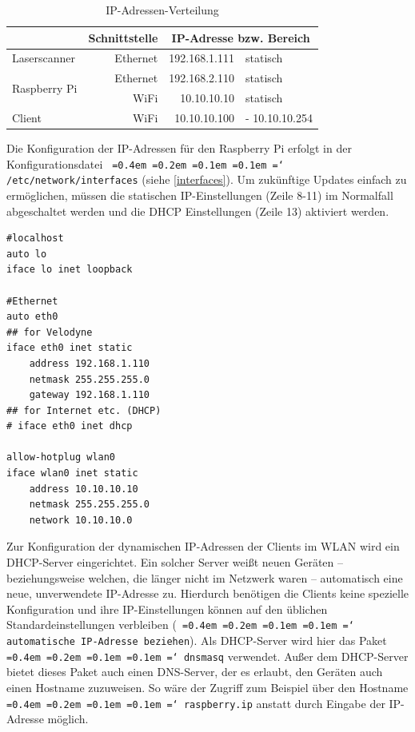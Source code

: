 \documentclass[a4paper,12pt,bibliography=totoc, listof=totoc,titlepage,pointlessnumbers]{scrreprt}
\newcommand*\justify{%
  \fontdimen2\font=0.4em%
  \fontdimen3\font=0.2em%
  \fontdimen4\font=0.1em%
  \fontdimen7\font=0.1em%
  \hyphenchar\font=`\-%
}
\newcommand{\code}[1]{\texttt{\justify{#1}}}
\begin{document}
\begin{table}[!ht]
\centering
\begin{tabular}{l|r|r|l|}
\cline{2-4}
                                                    & Schnittstelle & \multicolumn{2}{c|}{IP-Adresse bzw. Bereich} \\ \hline
\multicolumn{1}{|l|}{Laser\-scan\-ner}                  & Ethernet      & 192.168.1.111        & statisch              \\ \hline
\multicolumn{1}{|l|}{\multirow{2}{*}{Rasp\-berry Pi}} & Ethernet      & 192.168.2.110        & statisch              \\ \cline{2-4} 
\multicolumn{1}{|l|}{}                              & WiFi          & 10.10.10.10          & statisch              \\ \hline
\multicolumn{1}{|l|}{Client}                        & WiFi          & 10.10.10.100         & - 10.10.10.254        \\ \hline
\end{tabular}
\caption{IP-Adressen-Verteilung}
\label{tab:ipAdressen}
\end{table}

Die Konfiguration der IP-Adressen für den Rasp\-berry Pi erfolgt in der Konfigurationsdatei \code{/etc/network/interfaces} (siehe \autoref{interfaces}). Um zukünftige Updates einfach zu ermöglichen, müssen die statischen IP-Einstellungen (Zeile 8-11) im Normalfall abgeschaltet werden und die DHCP Einstellungen (Zeile 13) aktiviert werden. \citep{accesspoint}

\begin{lstlisting}[caption={Konfiguration der \code{/etc/network/interfaces}}, label={interfaces}]
#localhost
auto lo
iface lo inet loopback

#Ethernet
auto eth0
## for Velodyne
iface eth0 inet static
	address 192.168.1.110
	netmask 255.255.255.0
	gateway 192.168.1.110
## for Internet etc. (DHCP)
# iface eth0 inet dhcp

allow-hotplug wlan0
iface wlan0 inet static
	address 10.10.10.10
	netmask 255.255.255.0
	network 10.10.10.0
\end{lstlisting}

Zur Konfiguration der dynamischen IP-Adressen der Clients im WLAN wird ein DHCP-Server eingerichtet. Ein solcher Server weißt neuen Geräten -- beziehungsweise welchen, die länger nicht im Netzwerk waren -- automatisch eine neue, unverwendete IP-Adresse zu. Hierdurch benötigen die Clients keine spezielle Konfiguration und ihre IP-Einstellungen können auf den üblichen Standardeinstellungen verbleiben (\code{automatische IP-Adresse beziehen}). Als DHCP-Server wird hier das Paket \code{dnsmasq} verwendet. Außer dem DHCP-Server bietet dieses Paket auch einen DNS-Server, der es erlaubt, den Geräten auch einen Hostname zuzuweisen. So wäre der Zugriff zum Beispiel über den Hostname \code{raspberry.ip} anstatt durch Eingabe der IP-Adresse möglich.
\end{document}
